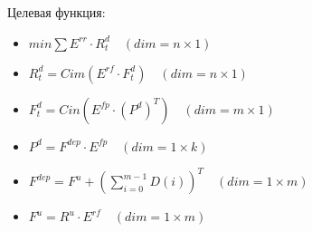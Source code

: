 \documentclass{article}
\begin{document}
  \thispagestyle{empty}
  Целевая функция:
  \begin{itemize}
    \item[] $\displaystyle min \sum E^{rr} \cdot R^{d}_{t} \quad (dim = n \times 1)$
    \item[] $R^{d}_{t} = Cim(E^{rf} \cdot F^{d}_{t}) \quad (dim = n \times 1)$
    \item[] $F^{d}_{t} = Cin(E^{fp} \cdot (P^{d})^{T}) \quad (dim = m \times 1)$
    \item[] $P^{d} = F^{dep} \cdot E^{fp} \quad (dim = 1 \times k)$
    \item[] $\displaystyle F^{dep} = F^{u} + (\sum^{m - 1}_{i = 0}D(i))^{T} \quad (dim = 1 \times m)$
    \item[] $F^{u} = R^{u} \cdot E^{rf} \quad (dim = 1 \times m)$
  \end{itemize}
\end{document}
